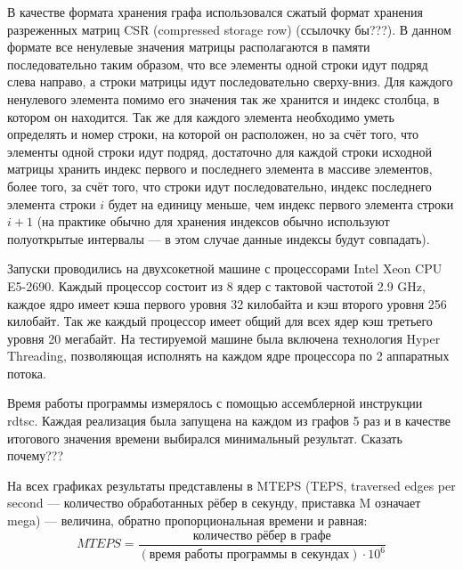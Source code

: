 \documentclass[a4paper,10pt]{extarticle}
\begin{document}
В качестве формата хранения графа использовался сжатый формат хранения разреженных матриц CSR (compressed storage row) (ссылочку бы???). В данном формате все ненулевые значения матрицы располагаются в памяти последовательно таким образом, что все элементы одной строки идут подряд слева направо, а строки матрицы идут последовательно сверху-вниз. 
Для каждого ненулевого элемента помимо его значения так же хранится и индекс столбца, в котором он находится. 
Так же для каждого элемента необходимо уметь определять и номер строки, на которой он расположен, но за счёт того, что элементы одной строки идут подряд, достаточно для каждой строки исходной матрицы хранить индекс первого и последнего элемента в массиве элементов, более того, за счёт того, что строки идут последовательно, индекс последнего элемента строки $i$ будет на единицу меньше, чем индекс первого элемента строки $i+1$ (на практике обычно для хранения индексов обычно используют полуоткрытые интервалы --- в этом случае данные индексы будут совпадать).

Запуски проводились на двухсокетной машине с процессорами Intel Xeon CPU E5-2690. Каждый процессор состоит из 8 ядер с тактовой частотой 2.9 GHz, каждое ядро имеет кэша первого уровня 32 килобайта и   кэш второго уровня 256 килобайт. Так же каждый процессор имеет общий для всех ядер кэш третьего уровня 20 мегабайт.
На тестируемой машине была включена технология Hyper Threading, позволяющая исполнять на каждом ядре процессора по 2 аппаратных потока.

Время работы программы измерялось с помощью ассемблерной инструкции rdtsc.
Каждая реализация была запущена на каждом из графов 5 раз и в качестве итогового значения времени выбирался минимальный результат. Сказать почему???

На всех графиках результаты представлены в MTEPS (TEPS, traversed edges per second --- количество обработанных рёбер в секунду, приставка M означает mega) --- величина, обратно пропорциональная времени и равная:
$$MTEPS = \frac{\texttt{количество рёбер в графе}}{(\texttt{время работы программы в секундах}) \cdot 10^6}$$



\end{document}
